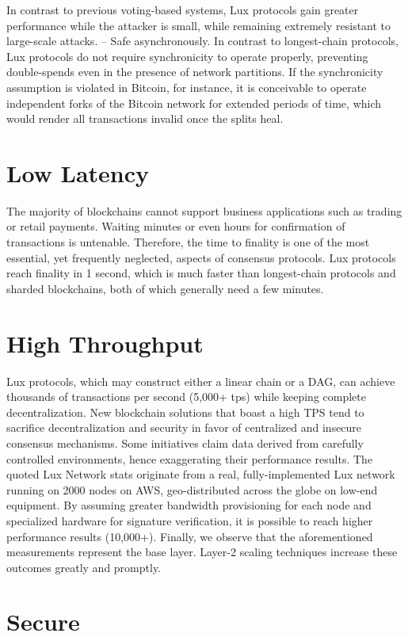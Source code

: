 \documentclass[11pt]{article}
\begin{document}
In contrast to previous voting-based systems, Lux protocols gain greater performance while the attacker is small, while remaining extremely resistant to large-scale attacks. -- Safe asynchronously. In contrast to longest-chain protocols, Lux protocols do not require synchronicity to operate properly, preventing double-spends even in the presence of network partitions. If the synchronicity assumption is violated in Bitcoin, for instance, it is conceivable to operate independent forks of the Bitcoin network for extended periods of time, which would render all transactions invalid once the splits heal.


\section{Low Latency}

The majority of blockchains cannot support business applications such as trading or retail payments. Waiting minutes or even hours for confirmation of transactions is untenable. Therefore, the time to finality is one of the most essential, yet frequently neglected, aspects of consensus protocols. Lux protocols reach finality in 1 second, which is much faster than longest-chain protocols and sharded blockchains, both of which generally need a few minutes.


\section{High Throughput}

Lux protocols, which may construct either a linear chain or a DAG, can achieve thousands of transactions per second (5,000+ tps) while keeping complete decentralization. New blockchain solutions that boast a high TPS tend to sacrifice decentralization and security in favor of centralized and insecure consensus mechanisms. Some initiatives claim data derived from carefully controlled environments, hence exaggerating their performance results. The quoted Lux Network stats originate from a real, fully-implemented Lux network running on 2000 nodes on AWS, geo-distributed across the globe on low-end equipment. By assuming greater bandwidth provisioning for each node and specialized hardware for signature verification, it is possible to reach higher performance results (10,000+). Finally, we observe that the aforementioned measurements represent the base layer. Layer-2 scaling techniques increase these outcomes greatly and promptly.


\section{Secure}
\end{document}
